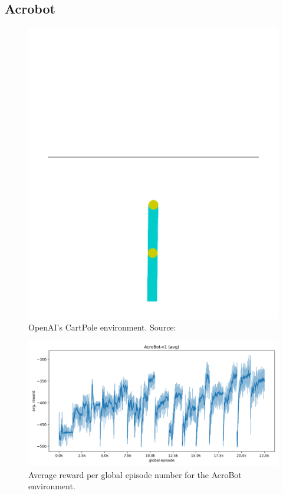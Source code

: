 \documentclass{article}
\begin{document}
\subsection{Acrobot}
\label{ssec:ab}

\begin{figure}[htbp]
    \centering
    \includegraphics[width=0.9\linewidth]{figs/acrobot.png}
    \caption{
        OpenAI's CartPole environment. 
        Source: \cite{gymlibraryAcrobot}
    }
    \label{fig:acrobot}
\end{figure}

\begin{figure}[htbp]
    \centering
    \includegraphics[width=0.9\linewidth]{figs/ab_avg_rewards.png}
    \caption{
        Average reward per global episode number for the AcroBot environment.
    }
    \label{fig:avg-ab}
\end{figure}
\end{document}
